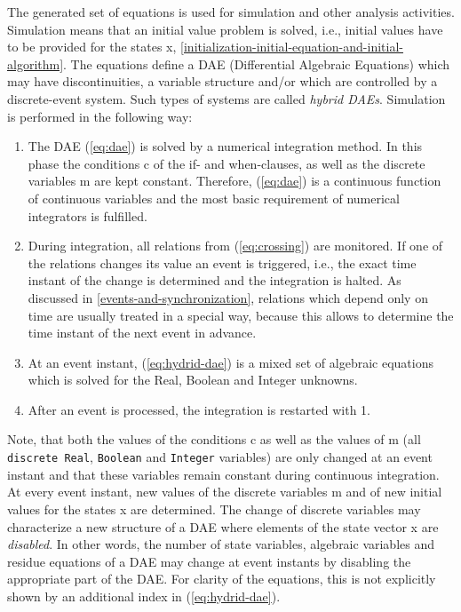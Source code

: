 The generated set of equations is used for simulation and other analysis
activities. Simulation means that an initial value problem is solved,
i.e., initial values have to be provided for the states x, \autoref{initialization-initial-equation-and-initial-algorithm}.
The equations define a DAE (Differential Algebraic Equations) which may
have discontinuities, a variable structure and/or which are controlled
by a discrete-event system. Such types of systems are called
\emph{hybrid DAEs}. Simulation is performed in the following way:
\begin{enumerate}
\item
  The DAE (\ref{eq:dae}) is solved by a numerical integration method. In this
  phase the conditions c of the if- and when-clauses, as well as the
  discrete variables m are kept constant. Therefore, (\ref{eq:dae}) is a
  continuous function of continuous variables and the most basic
  requirement of numerical integrators is fulfilled.
\item
  During integration, all relations from (\ref{eq:crossing}) are monitored. If one of
  the relations changes its value an event is triggered, i.e., the exact
  time instant of the change is determined and the integration is
  halted. As discussed in \autoref{events-and-synchronization}, relations which depend only on
  time are usually treated in a special way, because this allows to
  determine the time instant of the next event in advance.
\item
  At an event instant, (\ref{eq:hydrid-dae}) is a mixed set of algebraic equations which
  is solved for the Real, Boolean and Integer unknowns.
\item
  After an event is processed, the integration is restarted with 1.
\end{enumerate}

Note, that both the values of the conditions c as well as the values of
m (all \lstinline!discrete Real!, \lstinline!Boolean! and \lstinline!Integer! variables) are only changed at
an event instant and that these variables remain constant during
continuous integration. At every event instant, new values of the
discrete variables m and of new initial values for the states x are
determined. The change of discrete variables may characterize a new
structure of a DAE where elements of the state vector x are
\emph{disabled}. In other words, the number of state variables,
algebraic variables and residue equations of a DAE may change at event
instants by disabling the appropriate part of the DAE. For clarity of
the equations, this is not explicitly shown by an additional index in
(\ref{eq:hydrid-dae}).

